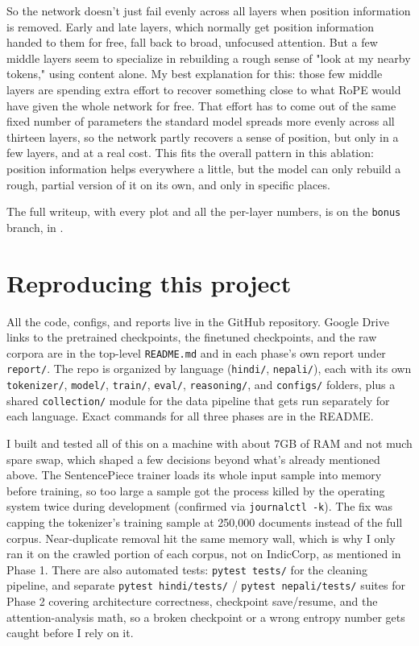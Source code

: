 \documentclass[10pt]{article}
\begin{document}
So the network doesn't just fail evenly across all layers when position information is removed. Early and late layers, which normally get position information handed to them for free, fall back to broad, unfocused attention. But a few middle layers seem to specialize in rebuilding a rough sense of "look at my nearby tokens," using content alone. My best explanation for this: those few middle layers are spending extra effort to recover something close to what RoPE would have given the whole network for free. That effort has to come out of the same fixed number of parameters the standard model spreads more evenly across all thirteen layers, so the network partly recovers a sense of position, but only in a few layers, and at a real cost. This fits the overall pattern in this ablation: position information helps everywhere a little, but the model can only rebuild a rough, partial version of it on its own, and only in specific places.

The full writeup, with every plot and all the per-layer numbers, is on the \texttt{bonus} branch, in .

\section{Reproducing this project}

All the code, configs, and reports live in the GitHub repository. Google Drive links to the pretrained checkpoints, the finetuned checkpoints, and the raw corpora are in the top-level \texttt{README.md} and in each phase's own report under \texttt{report/}. The repo is organized by language (\texttt{hindi/}, \texttt{nepali/}), each with its own \texttt{tokenizer/}, \texttt{model/}, \texttt{train/}, \texttt{eval/}, \texttt{reasoning/}, and \texttt{configs/} folders, plus a shared \texttt{collection/} module for the data pipeline that gets run separately for each language. Exact commands for all three phases are in the README.

I built and tested all of this on a machine with about 7GB of RAM and not much spare swap, which shaped a few decisions beyond what's already mentioned above. The SentencePiece trainer loads its whole input sample into memory before training, so too large a sample got the process killed by the operating system twice during development (confirmed via \texttt{journalctl -k}). The fix was capping the tokenizer's training sample at 250,000 documents instead of the full corpus. Near-duplicate removal hit the same memory wall, which is why I only ran it on the crawled portion of each corpus, not on IndicCorp, as mentioned in Phase 1. There are also automated tests: \texttt{pytest tests/} for the cleaning pipeline, and separate \texttt{pytest hindi/tests/} / \texttt{pytest nepali/tests/} suites for Phase 2 covering architecture correctness, checkpoint save/resume, and the attention-analysis math, so a broken checkpoint or a wrong entropy number gets caught before I rely on it.
\end{document}

